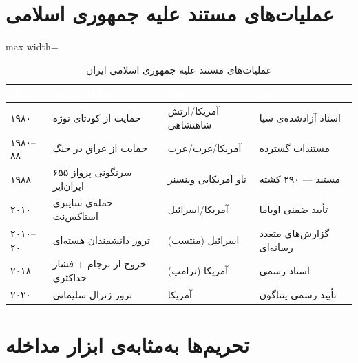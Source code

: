\section{عملیات‌های مستند علیه جمهوری اسلامی}
\label{sec:app-c-operations}


\begin{table}[htbp]
\centering
\caption{عملیات‌های مستند علیه جمهوری اسلامی ایران}
\label{tab:app-c-operations}
\begin{adjustbox}{max width=\linewidth}
\begin{tabularx}{\linewidth}{
    >{\centering\arraybackslash}p{1.5cm}
    >{\raggedleft\arraybackslash}p{46mm}
    >{\raggedleft\arraybackslash}p{35mm}
    >{\raggedleft\arraybackslash}X
}
\toprule
\rowcolor{PrimaryDeep}
\textcolor{white}{\textbf{سال}} &
\textcolor{white}{\textbf{عملیات/رویداد}} &
\textcolor{white}{\textbf{عامل}} &
\textcolor{white}{\textbf{منبع}} \\
\midrule
۱۹۸۰ & حمایت از کودتای نوژه & آمریکا/ارتش شاهنشاهی & اسناد آزادشده‌ی سیا \\
\rowcolor{NeutralLight}
۱۹۸۰–۸۸ & حمایت از عراق در جنگ & آمریکا/غرب/عرب & مستندات گسترده \\
۱۹۸۸ & سرنگونی پرواز ۶۵۵ ایران‌ایر & ناو آمریکایی وینسنز & مستند — ۲۹۰ کشته \\
\rowcolor{NeutralLight}
۲۰۱۰ & حمله‌ی سایبری استاکس‌نت & آمریکا/اسرائیل & تأیید ضمنی اوباما \\
۲۰۱۰–۲۰ & ترور دانشمندان هسته‌ای & اسرائیل (منتسب) & گزارش‌های متعدد رسانه‌ای \\
\rowcolor{NeutralLight}
۲۰۱۸ & خروج از برجام + فشار حداکثری & آمریکا (ترامپ) & اسناد رسمی \\
۲۰۲۰ & ترور ژنرال سلیمانی & آمریکا & تأیید رسمی پنتاگون \\
\bottomrule
\end{tabularx}
\end{adjustbox}
\end{table}

\section{تحریم‌ها به‌مثابه‌ی ابزار مداخله}
\label{sec:app-c-sanctions}

